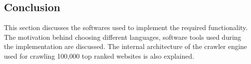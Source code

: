 \subsection{Conclusion}
\noindent This section discusses the softwares used to implement the required functionality. The motivation behind choosing different languages, software tools used during the implementation are discussed. The internal architecture of the crawler engine used for crawling 100,000 top ranked websites is also explained.\\
\clearpage